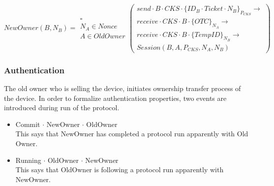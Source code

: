 \documentclass[letterpaper]{article}
\begin{document}
\begin{figure*}[bpht!]
\begin{dmath}\label{eq:4}
NewOwner(B,N_{B})= \begin{array}{c} \square \\N_{A}\in Nonce \\ A\in OldOwner \end{array} \left(\begin{array}{c} send \cdot B \cdot CKS \cdot \{ID_{B} \cdot Ticket \cdot N_{B}\}_{P_{CKS}}     \rightarrow \\ receive \cdot CKS \cdot B \cdot \{OTC\}_{N_{A}} \rightarrow \\
receive\cdot CKS \cdot B \cdot  \{TempID\}_{N_{B}} \rightarrow \\ 
Session(B,A,P_{CKS},N_{A},N_{B})\end{array} \right)
\end{dmath}
\end{figure*}
\subsubsection{Authentication}
The old owner who is selling the device, initiates ownership transfer process of the device. In order to formalize authentication properties, two events are introduced during run of the protocol.\\
\begin{itemize}
\item Commit $\cdot$ NewOwner $\cdot$ OldOwner \\ 
This says that NewOwner has completed a protocol run apparently with Old Owner.\\
\item Running $\cdot$ OldOwner $\cdot$ NewOwner \\ 
This says that OldOwner is following a protocol run apparently with NewOwner.\\
\end{itemize}
 	
\end{document}
